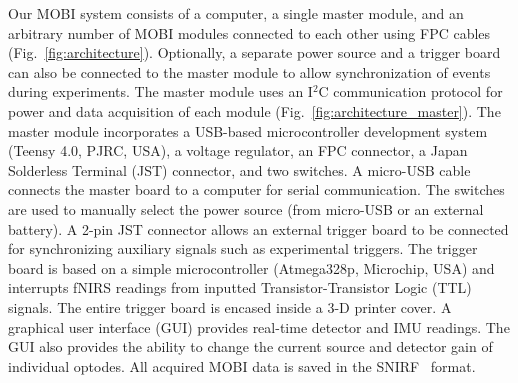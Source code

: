 Our MOBI system consists of a computer, a single master module, and an arbitrary number of MOBI modules connected to each other using FPC cables (Fig.~\ref{fig:architecture}). Optionally, a separate power source and a trigger board can also be connected to the master module to allow synchronization of events during experiments. The master module uses an I$^2$C communication protocol for power and data acquisition of each module (Fig.~\ref{fig:architecture_master}). The master module incorporates a USB-based microcontroller development system (Teensy 4.0, PJRC, USA), a voltage regulator, an FPC connector, a Japan Solderless Terminal (JST) connector, and two switches. A micro-USB cable connects the master board to a computer for serial communication. The switches are used to manually select the power source (from micro-USB or an external battery). A 2-pin JST connector allows an external trigger board to be connected for synchronizing auxiliary signals such as experimental triggers. The trigger board is based on a simple microcontroller (Atmega328p, Microchip, USA) and interrupts fNIRS readings from inputted Transistor-Transistor Logic (TTL) signals. The entire trigger board is encased inside a 3-D printer cover. A graphical user interface (GUI) provides real-time detector and IMU readings. The GUI also provides the ability to change the current source and detector gain of individual optodes. All acquired MOBI data is saved in the SNIRF~\cite{snirf2021} format. 

